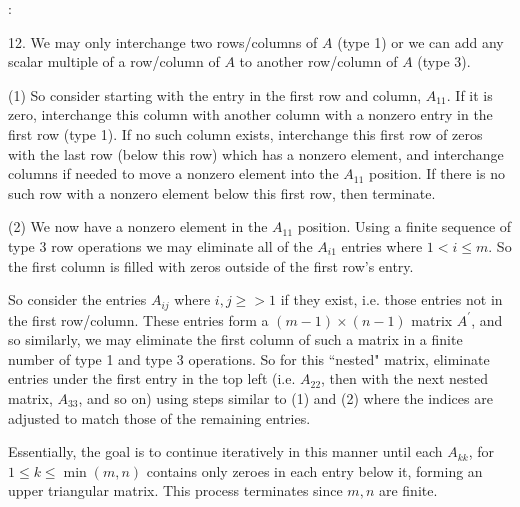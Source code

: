 \documentclass[11pt]{article}
\begin{document}
:

12. We may only interchange two rows/columns of $A$ (type 1) or we can add any scalar multiple of a row/column of $A$ to another row/column of $A$ (type 3).

(1) So consider starting with the entry in the first row and column, $A_{11}$. If it is zero, interchange this column with another column with a nonzero entry in the first row (type 1). If no such column exists, interchange this first row of zeros with the last row (below this row) which has a nonzero element, and interchange columns if needed to move a nonzero element into the $A_{11}$ position. If there is no such row with a nonzero element below this first row, then terminate.

(2) We now have a nonzero element in the $A_{11}$ position. Using a finite sequence of type 3 row operations we may eliminate all of the $A_{i1}$ entries where $1<i\leq m$. So the first column is filled with zeros outside of the first row's entry. 

So consider the entries $A_{ij}$ where $i,j \geq > 1$ if they exist, i.e. those entries not in the first row/column. These entries form a $(m-1) \times (n-1)$ matrix $A^{\prime}$, and so similarly, we may eliminate the first column of such a matrix in a finite number of type 1 and type 3 operations. So for this ``nested" matrix, eliminate entries under the first entry in the top left (i.e. $A_{22}$, then with the next nested matrix, $A_{33}$, and so on) using steps similar to (1) and (2) where the indices are adjusted to match those of the remaining entries. 

Essentially, the goal is to continue iteratively in this manner until each $A_{kk}$, for $1 \leq k \leq \min(m,n)$ contains only zeroes in each entry below it, forming an upper triangular matrix. This process terminates since $m,n$ are finite.
\end{document}
